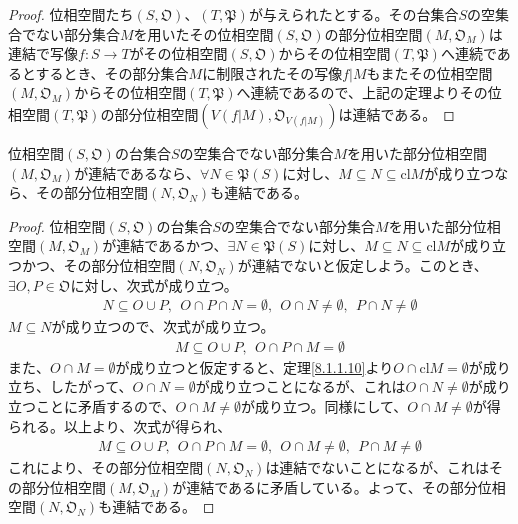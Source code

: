 \documentclass[dvipdfmx]{jsarticle}
\begin{document}
\begin{proof}
位相空間たち$\left( S,\mathfrak{O} \right)$、$\left( T,\mathfrak{P} \right)$が与えられたとする。その台集合$S$の空集合でない部分集合$M$を用いたその位相空間$\left( S,\mathfrak{O} \right)$の部分位相空間$\left( M,\mathfrak{O}_{M} \right)$は連結で写像$f:S \rightarrow T$がその位相空間$\left( S,\mathfrak{O} \right)$からその位相空間$\left( T,\mathfrak{P} \right)$へ連続であるとするとき、その部分集合$M$に制限されたその写像$f|M$もまたその位相空間$\left( M,\mathfrak{O}_{M} \right)$からその位相空間$\left( T,\mathfrak{P} \right)$へ連続であるので、上記の定理よりその位相空間$\left( T,\mathfrak{P} \right)$の部分位相空間$\left( V\left( f|M \right),\mathfrak{O}_{V\left( f|M \right)} \right)$は連結である。
\end{proof}
\begin{thm}\label{8.1.5.5}
位相空間$\left( S,\mathfrak{O} \right)$の台集合$S$の空集合でない部分集合$M$を用いた部分位相空間$\left( M,\mathfrak{O}_{M} \right)$が連結であるなら、$\forall N \in \mathfrak{P}(S)$に対し、$M \subseteq N \subseteq {\mathrm{cl}}M$が成り立つなら、その部分位相空間$\left( N,\mathfrak{O}_{N} \right)$も連結である。
\end{thm}
\begin{proof}
位相空間$\left( S,\mathfrak{O} \right)$の台集合$S$の空集合でない部分集合$M$を用いた部分位相空間$\left( M,\mathfrak{O}_{M} \right)$が連結であるかつ、$\exists N \in \mathfrak{P}(S)$に対し、$M \subseteq N \subseteq {\mathrm{cl}}M$が成り立つかつ、その部分位相空間$\left( N,\mathfrak{O}_{N} \right)$が連結でないと仮定しよう。このとき、$\exists O,P \in \mathfrak{O}$に対し、次式が成り立つ。
\begin{align*}
N \subseteq O \cup P,\ \ O \cap P \cap N = \emptyset,\ \ O \cap N \neq \emptyset,\ \ P \cap N \neq \emptyset
\end{align*}
$M \subseteq N$が成り立つので、次式が成り立つ。
\begin{align*}
M \subseteq O \cup P,\ \ O \cap P \cap M = \emptyset
\end{align*}
また、$O \cap M = \emptyset$が成り立つと仮定すると、定理\ref{8.1.1.10}より$O \cap {\mathrm{cl}}M = \emptyset$が成り立ち、したがって、$O \cap N = \emptyset$が成り立つことになるが、これは$O \cap N \neq \emptyset$が成り立つことに矛盾するので、$O \cap M \neq \emptyset$が成り立つ。同様にして、$O \cap M \neq \emptyset$が得られる。以上より、次式が得られ、
\begin{align*}
M \subseteq O \cup P,\ \ O \cap P \cap M = \emptyset,\ \ O \cap M \neq \emptyset,\ \ P \cap M \neq \emptyset
\end{align*}
これにより、その部分位相空間$\left( N,\mathfrak{O}_{N} \right)$は連結でないことになるが、これはその部分位相空間$\left( M,\mathfrak{O}_{M} \right)$が連結であるに矛盾している。よって、その部分位相空間$\left( N,\mathfrak{O}_{N} \right)$も連結である。
\end{proof}
\end{document}
